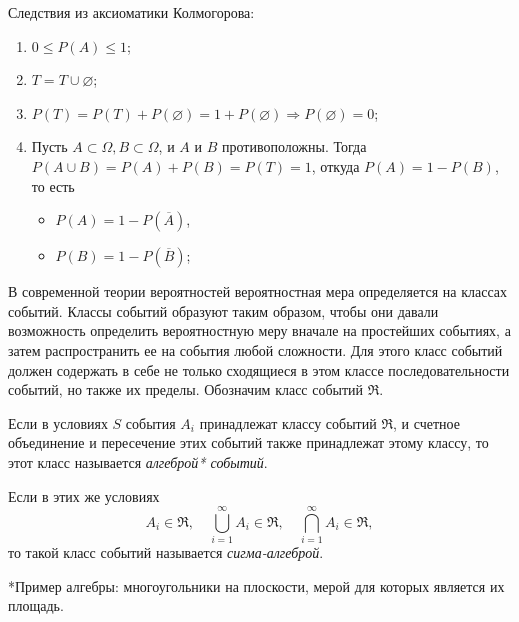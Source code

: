 \documentclass[polytech/stats/exam-2023/stats-exam-2023.tex]{subfiles}
\begin{document}
    Следствия из аксиоматики Колмогорова:
    \begin{enumerate}
        \item $0 \leq P(A) \leq 1$;
        \item $T = T \cup \varnothing$;
        \item $P(T) = P(T) + P(\varnothing) = 1 + P(\varnothing) \Rightarrow P(\varnothing) = 0$;
        \item Пусть $A \subset \Omega, B \subset \Omega$, и $A$ и $B$ противоположны. Тогда $P(A \cup B) = P(A) + P(B) = P(T) = 1$,
        откуда $P(A) = 1 - P(B)$, то есть
        \begin{itemize}
            \item[] $P(A) = 1 - P(\overline{A})$,
            \item[] $P(B) = 1 - P(\overline{B})$;
        \end{itemize}
    \end{enumerate}

    В современной теории вероятностей вероятностная мера определяется на классах событий. Классы событий образуют таким образом,
    чтобы они давали возможность определить вероятностную меру вначале на простейших событиях, а затем распространить ее на события
    любой сложности. Для этого класс событий должен содержать в себе не только сходящиеся в этом классе последовательности событий,
    но также их пределы. Обозначим класс событий $\mathfrak{R}$. 
    
    \begin{definition}
        Если в условиях $S$ события $A_i$ принадлежат классу событий $\mathfrak{R}$, и счетное объединение и пересечение этих событий также
        принадлежат этому классу, то этот класс называется \textit{алгеброй* событий}.
        \vspace{0.5cm}
        
        Если в этих же условиях
        \begin{equation*}
            A_i \in \mathfrak{R}, \quad \bigcup_{i=1}^{\infty} A_i \in \mathfrak{R}, \quad \bigcap_{i=1}^{\infty} A_i \in \mathfrak{R},
        \end{equation*}
        то такой класс событий называется \textit{сигма-алгеброй}.
        \vspace{0.5cm}
        
        *Пример алгебры: многоугольники на плоскости, мерой для которых является их площадь.
    \end{definition}
    \newpage
\end{document}
